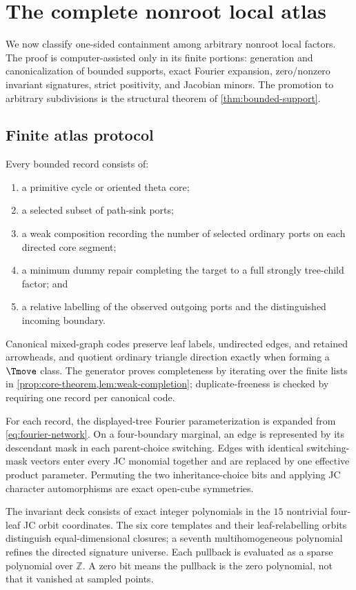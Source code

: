 \section{The complete nonroot local atlas}\label{sec:atlas}

We now classify one-sided containment among arbitrary nonroot local factors.  The proof is computer-assisted only in its finite portions: generation and canonicalization of bounded supports, exact Fourier expansion, zero/nonzero invariant signatures, strict positivity, and Jacobian minors.  The promotion to arbitrary subdivisions is the structural theorem of \cref{thm:bounded-support}.

\subsection{Finite atlas protocol}

Every bounded record consists of:
\begin{enumerate}[label=\textup{(\roman*)}]
\item a primitive cycle or oriented theta core;
\item a selected subset of path-sink ports;
\item a weak composition recording the number of selected ordinary ports on each directed core segment;
\item a minimum dummy repair completing the target to a full strongly tree-child factor; and
\item a relative labelling of the observed outgoing ports and the distinguished incoming boundary.
\end{enumerate}
Canonical mixed-graph codes preserve leaf labels, undirected edges, and retained arrowheads, and quotient ordinary triangle direction exactly when forming a $\Tmove$ class.  The generator proves completeness by iterating over the finite lists in \cref{prop:core-theorem,lem:weak-completion}; duplicate-freeness is checked by requiring one record per canonical code.

For each record, the displayed-tree Fourier parameterization is expanded from \eqref{eq:fourier-network}.  On a four-boundary marginal, an edge is represented by its descendant mask in each parent-choice switching.  Edges with identical switching-mask vectors enter every JC monomial together and are replaced by one effective product parameter.  Permuting the two inheritance-choice bits and applying JC character automorphisms are exact open-cube symmetries.

The invariant deck consists of exact integer polynomials in the $15$ nontrivial four-leaf JC orbit coordinates.  The six core templates and their leaf-relabelling orbits distinguish equal-dimensional closures; a seventh multihomogeneous polynomial refines the directed signature universe.  Each pullback is evaluated as a sparse polynomial over $\mathbb Z$.  A zero bit means the pullback is the zero polynomial, not that it vanished at sampled points.

